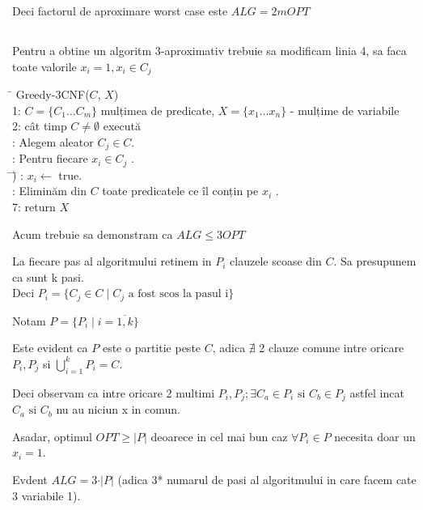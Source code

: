 \documentclass[a4paper]{report} %
\begin{document}
Deci factorul de aproximare worst case este $ALG=2mOPT$

\subsection{}

Pentru a obtine un algoritm 3-aproximativ trebuie sa modificam linia 4, sa faca toate valorile $x_{i}=1, x_{i} \in C_{j}$

\begin{tabbing}
\hspace{2em}\= \kill 
Greedy-3CNF($C$, $X$)\\
1: $C=\{C_{1}\dots C_{m}\}$ mulțimea de predicate, $X=\{x_{1}\dots x_{n}\}$ - mulțime de variabile\\ 
2: cât timp $C\neq \emptyset$ execută\\ 
: Alegem aleator $C_{j}\in C$.\\
: Pentru fiecare $x_{i} \in C_{j}$ .\\
\hspace{2em}\= \hspace{2em}\=)\kill 
\> : $x_{i}\leftarrow$ true.\\
\> : Eliminăm din $C$ toate predicatele ce îl conțin pe $x_{i}$ .\\
7: return $X$\\
\end{tabbing}

Acum trebuie sa demonstram ca $ALG\leq 3OPT$

La fiecare pas al algoritmului retinem in $P_{i}$ clauzele scoase din $C$. Sa presupunem ca sunt k pasi.\\

Deci $P_{i}=\{C_{j}\in C \mid C_{j}\text{ a fost scos la pasul i}\}$ 

Notam $P=\{P_{i} \mid i=\overline{1,k}\}$

Este evident ca $P$ este o partitie peste $C$, adica $\nexists$ 2 clauze comune intre oricare $P_{i}, P_{j}$ si $\bigcup\limits_{i=1}^{k} P_{i}=C$.

Deci observam ca intre oricare 2 multimi $P_{i}, P_{j}; \exists C_{a}\in P_{i} \text{ si } C_{b}\in P_{j}$ astfel incat $C_{a} \text{ si } C_{b}$ nu au niciun x in comun.

Asadar, optimul $OPT\geq \vert P\vert$ deoarece in cel mai bun caz $\forall P_{i}\in P$ necesita doar un $x_{i}=1$.

Evdent $ALG=3\cdot \vert P \vert$ (adica 3* numarul de pasi al algoritmului in care facem cate 3 variabile 1).
\end{document}
